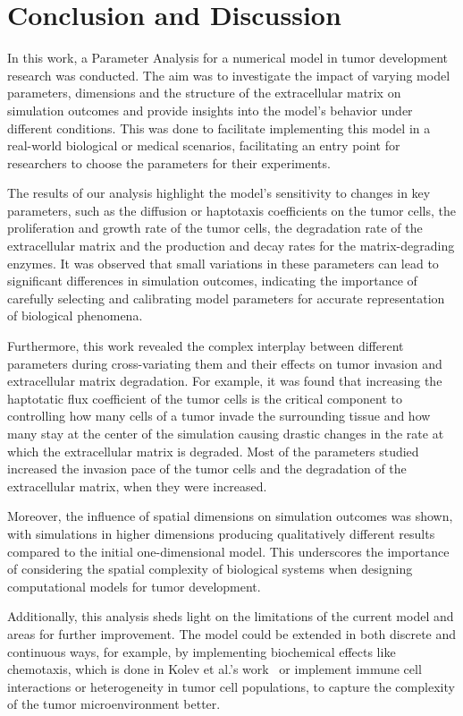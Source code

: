 \section{Conclusion and Discussion}
In this work, a Parameter Analysis for a numerical model in tumor development research was conducted. The aim was to investigate the impact of varying model parameters, dimensions and the structure of the extracellular matrix on simulation outcomes and provide insights into the model's behavior under different conditions. This was done to facilitate implementing this model in a real-world biological or medical scenarios, facilitating an entry point for researchers to choose the parameters for their experiments.

The results of our analysis highlight the model's sensitivity to changes in key parameters, such as the diffusion or haptotaxis coefficients on the tumor cells, the proliferation and growth rate of the tumor cells, the degradation rate of the extracellular matrix and the production and decay rates for the matrix-degrading enzymes. It was observed that small variations in these parameters can lead to significant differences in simulation outcomes, indicating the importance of carefully selecting and calibrating model parameters for accurate representation of biological phenomena.

Furthermore, this work revealed the complex interplay between different parameters during cross-variating them and their effects on tumor invasion and extracellular matrix degradation. For example, it was found that increasing the haptotatic flux coefficient of the tumor cells is the critical component to controlling how many cells of a tumor invade the surrounding tissue and how many stay at the center of the simulation causing drastic changes in the rate at which the extracellular matrix is degraded. Most of the parameters studied increased the invasion pace of the tumor cells and the degradation of the extracellular matrix, when they were increased.

Moreover, the influence of spatial dimensions on simulation outcomes was shown, with simulations in higher dimensions producing qualitatively different results compared to the initial one-dimensional model. This underscores the importance of considering the spatial complexity of biological systems when designing computational models for tumor development.

Additionally, this analysis sheds light on the limitations of the current model and areas for further improvement. The model could be extended in both discrete and continuous ways, for example, by implementing biochemical effects like chemotaxis, which is done in Kolev et al.'s work~\cite{Kolev2010} or implement immune cell interactions or heterogeneity in tumor cell populations, to capture the complexity of the tumor microenvironment better.

